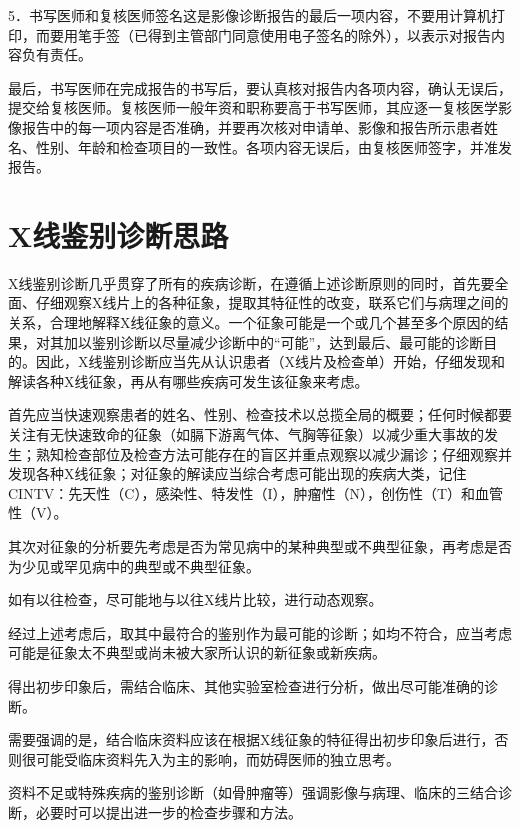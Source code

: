 5．书写医师和复核医师签名这是影像诊断报告的最后一项内容，不要用计算机打印，而要用笔手签（已得到主管部门同意使用电子签名的除外），以表示对报告内容负有责任。

最后，书写医师在完成报告的书写后，要认真核对报告内各项内容，确认无误后，提交给复核医师。复核医师一般年资和职称要高于书写医师，其应逐一复核医学影像报告中的每一项内容是否准确，并要再次核对申请单、影像和报告所示患者姓名、性别、年龄和检查项目的一致性。各项内容无误后，由复核医师签字，并准发报告。

\section{X线鉴别诊断思路}

X线鉴别诊断几乎贯穿了所有的疾病诊断，在遵循上述诊断原则的同时，首先要全面、仔细观察X线片上的各种征象，提取其特征性的改变，联系它们与病理之间的关系，合理地解释X线征象的意义。一个征象可能是一个或几个甚至多个原因的结果，对其加以鉴别诊断以尽量减少诊断中的“可能”，达到最后、最可能的诊断目的。因此，X线鉴别诊断应当先从认识患者（X线片及检查单）开始，仔细发现和解读各种X线征象，再从有哪些疾病可发生该征象来考虑。

首先应当快速观察患者的姓名、性别、检查技术以总揽全局的概要；任何时候都要关注有无快速致命的征象（如膈下游离气体、气胸等征象）以减少重大事故的发生；熟知检查部位及检查方法可能存在的盲区并重点观察以减少漏诊；仔细观察并发现各种X线征象；对征象的解读应当综合考虑可能出现的疾病大类，记住CINTV：先天性（C），感染性、特发性（I），肿瘤性（N），创伤性（T）和血管性（V）。

其次对征象的分析要先考虑是否为常见病中的某种典型或不典型征象，再考虑是否为少见或罕见病中的典型或不典型征象。

如有以往检查，尽可能地与以往X线片比较，进行动态观察。

经过上述考虑后，取其中最符合的鉴别作为最可能的诊断；如均不符合，应当考虑可能是征象太不典型或尚未被大家所认识的新征象或新疾病。

得出初步印象后，需结合临床、其他实验室检查进行分析，做出尽可能准确的诊断。

需要强调的是，结合临床资料应该在根据X线征象的特征得出初步印象后进行，否则很可能受临床资料先入为主的影响，而妨碍医师的独立思考。

资料不足或特殊疾病的鉴别诊断（如骨肿瘤等）强调影像与病理、临床的三结合诊断，必要时可以提出进一步的检查步骤和方法。

\protect\hypertarget{text00007.html}{}{}

